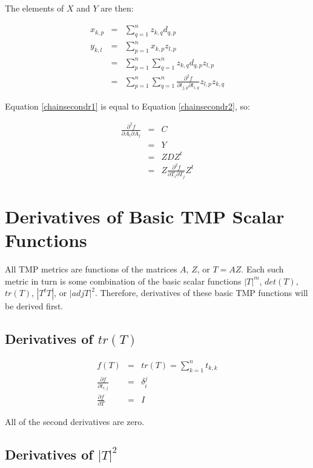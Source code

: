 \documentclass{report}
\begin{document}
\noindent The elements of $X$ and $Y$ are then:

\begin{eqnarray}
x_{k,p} & = & \sum_{q=1}^n z_{k,q} d_{q,p} \\
y_{k,l} & = & \sum_{p=1}^n x_{k,p} z_{l,p} \\ 
        & = & \sum_{p=1}^n \sum_{q=1}^n z_{k,q} d_{q,p} z_{l,p} \\
\label{chainsecondr2}
        & = & \sum_{p=1}^n \sum_{q=1}^n \frac{\partial^2 f}{\partial t_{j,p} \partial t_{i,q}} z_{l,p} z_{k,q}
\end{eqnarray}

\noindent Equation \ref{chainsecondr1} is equal to Equation \ref{chainsecondr2}, so:

\begin{eqnarray}
\frac{\partial^2 f}{\partial A_i \partial A_j} &=& C \\
&=& Y \\
&=& Z D Z^t \\
&=& Z \frac{\partial^2 f}{\partial T_i \partial T_j} Z^t 
\end{eqnarray}


\section{Derivatives of Basic TMP Scalar Functions}
All TMP metrics are functions of the matrices $A$, $Z$, or $T=AZ$.
Each such metric in turn is some combination of the basic scalar functions
$|T|^m$, $det(T)$, $tr(T)$, $|T^t T|$, or $|adj T|^2$.  Therefore, derivatives
of these basic TMP functions will be derived first. \newline

\subsection{Derivatives of $tr(T)$}

\begin{eqnarray}
f(T) & = & tr(T) = \sum_{k=1}^n t_{k,k} \\
\frac{\partial f}{\partial t_{i,j}} &=& \delta_i^j \\
\frac{\partial f}{\partial T} &=& I 
\end{eqnarray}

\noindent All of the second derivatives are zero. \newline

\subsection{Derivatives of $|T|^2$}
\end{document}
